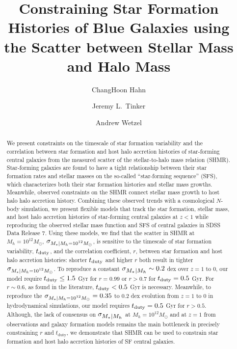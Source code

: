 \documentclass[12pt, letterpaper, preprint, tighten]{aastex62}
\newcommand{\tduty}{t_{\rm duty}}
\newcommand{\siglogm}{\sigma_{\scaleto{M_*|M_h}{8pt}}}
\newcommand{\sigtwe}{\sigma_{\scaleto{M_*|M_h=10^{12}M_\odot}{8pt}}}
\begin{document}
\sloppy\sloppypar\frenchspacing

\title{Constraining Star Formation Histories of Blue Galaxies using the Scatter between Stellar Mass and Halo Mass} 
\author{ChangHoon Hahn}
\author{Jeremy L.~Tinker}
\author{Andrew Wetzel}

\begin{abstract}
    We present constraints on the timescale of star formation variability and 
    the correlation between star formation and host halo accretion histories 
    of star-forming central galaxies from the measured scatter of the stellar-to-halo 
    mass relation (SHMR). Star-forming galaxies are found to have a tight relationship
    between their star formation rates and stellar masses on the so-called ``star-forming
    sequence'' (SFS), which characterizes both their star formation histories and
    stellar mass growths. Meanwhile, observed constraints on the SHMR connect 
    stellar mass growth to host halo halo accretion history. Combining these observed 
    trends with a cosmological $N$-body simulation, we present flexible models that 
    track the star formation, stellar mass, and host halo accretion histories of 
    star-forming central galaxies at $z < 1$ while reproducing the observed stellar 
    mass function and SFS of central galaxies in SDSS Data Release 7. Using these 
    models, we find that the scatter in SHMR at $M_h{=}10^{12}M_\odot$, $\sigtwe$, 
    is sensitive to the timescale of star 
    formation variability, $t_{\rm duty}$, and the correlation coefficient, $r$, 
    between star formation and host halo accretion histories: shorter $\tduty$ and 
    higher $r$ both result in tighter $\sigtwe$. To reproduce a constant 
    $\siglogm \sim 0.2$ dex over $z=1$ to 0, our model require $\tduty \leq 1.5$ Gyr 
    for $r = 0.99$ or $r > 0.7$ for $\tduty = 0.5$ Gyr. For $r \sim 0.6$, as found 
    in the literature, $\tduty < 0.5$ Gyr is necessary. Meanwhile, to reproduce 
    the $\sigtwe = 0.35$ to 0.2 dex evolution from $z=1$ to 0 in hydrodynamical 
    simulations, our model requires $\tduty = 0.5$ Gyr for $r > 0.5$. 
    Although, the lack of consensus on $\siglogm$ at $M_h=10^{12}M_\odot$ and at 
    $z=1$ from observations and galaxy formation models remains the main bottleneck 
    in precisely constraining $r$ and $t_\mathrm{duty}$, we demonstrate that SHMR 
    can be used to constrain star formation and host halo accretion histories of 
    SF central galaxies.
\end{abstract}
\end{document}
